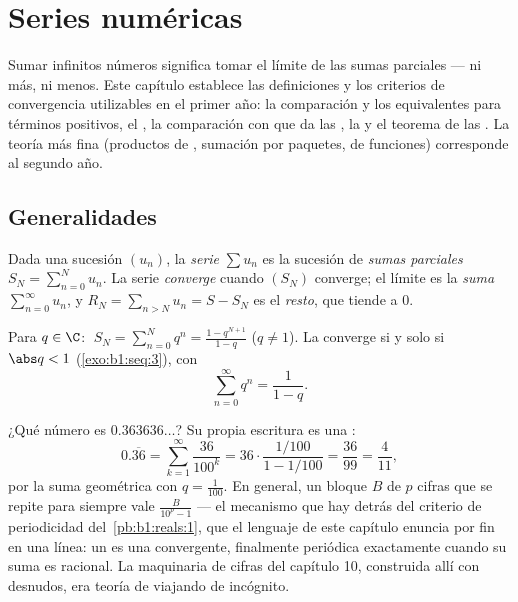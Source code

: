 \chapter{Series numéricas}\label{ch:b1:series}

Sumar infinitos números significa tomar el límite de las sumas
parciales --- ni más, ni menos. Este capítulo establece las
definiciones y los criterios de convergencia utilizables en el primer
año: la comparación y los equivalentes para términos positivos, el
, la comparación con  que da las
, la  y el teorema de las
. La teoría más fina (productos de ,
sumación por paquetes,  de funciones) corresponde al segundo año.

\section{Generalidades}

\begin{definition}\label{def:b1:series:def}
Dada una sucesión $(u_n)$, la \emph{serie} $\sum u_n$ es
la sucesión de \emph{sumas parciales} $S_N = \sum_{n=0}^{N} u_n$. La
serie \emph{converge} cuando $(S_N)$ converge; el límite es la
\emph{suma} $\sum_{n=0}^{\infty} u_n$, y
$R_N = \sum_{n > N} u_n = S - S_N$ es el \emph{resto}, que tiende a $0$.
\end{definition}

\begin{example}\label{ex:b1:series:geometric}
Para $q \in \C$: $\;S_N = \sum_{n=0}^{N} q^n = \frac{1 -
q^{N+1}}{1-q}$ ($q \neq 1$). La  converge si y solo si
$\abs q < 1$ (\cref{exo:b1:seq:3}), con
\[
\sum_{n=0}^{\infty} q^n = \frac{1}{1 - q} .
\]
\end{example}

\begin{example}\label{ex:b1:series:periodicdecimal}
¿Qué número es $0.363636\dots$? Su propia escritura es una :
\[
0.\overline{36} = \sum_{k=1}^{\infty} \frac{36}{100^k}
= 36\cdot\frac{1/100}{1 - 1/100} = \frac{36}{99} =
\frac{4}{11} ,
\]
por la suma geométrica con $q = \frac{1}{100}$. En general, un
bloque $B$ de $p$ cifras que se repite para siempre vale
$\frac{B}{10^p - 1}$ --- el mecanismo que hay detrás del criterio de
periodicidad del~\cref{pb:b1:reals:1}, que el lenguaje de este
capítulo enuncia por fin en una línea: un  es una
 convergente, finalmente periódica exactamente cuando su suma
es racional. La maquinaria de cifras del capítulo 10, construida allí
con  desnudos, era teoría de  viajando de incógnito.
\end{example}

